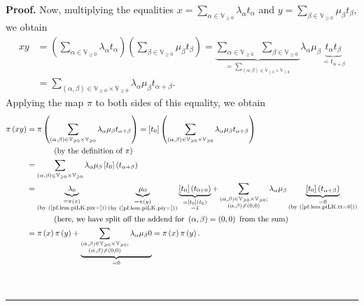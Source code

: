 \documentclass[numbers=enddot,12pt,final,onecolumn,notitlepage]{scrartcl}%
\theoremstyle{definition}
\newenvironment{proof}[1][Proof]{\noindent\textbf{#1.} }{\ \rule{0.5em}{0.5em}}
\let\sumnonlimits\sum
\renewcommand{\sum}{\sumnonlimits\limits}
\renewcommand{\geq}{\geqslant}
\theoremstyle{plainsl}
\begin{document}
\begin{proof}
Now, multiplying the equalities $x=\sum_{\alpha\in\mathbb{V}_{\geq0}}%
\lambda_{\alpha}t_{\alpha}$ and $y=\sum_{\beta\in\mathbb{V}_{\geq0}}\mu
_{\beta}t_{\beta}$, we obtain%
\begin{align*}
xy  &  =\left(  \sum_{\alpha\in\mathbb{V}_{\geq0}}\lambda_{\alpha}t_{\alpha
}\right)  \left(  \sum_{\beta\in\mathbb{V}_{\geq0}}\mu_{\beta}t_{\beta
}\right)  =\underbrace{\sum_{\alpha\in\mathbb{V}_{\geq0}}\ \ \sum_{\beta
\in\mathbb{V}_{\geq0}}}_{=\sum_{\left(  \alpha,\beta\right)  \in
\mathbb{V}_{\geq0}\times\mathbb{V}_{\geq0}}}\lambda_{\alpha}\mu_{\beta
}\underbrace{t_{\alpha}t_{\beta}}_{=t_{\alpha+\beta}}\\
&  =\sum_{\left(  \alpha,\beta\right)  \in\mathbb{V}_{\geq0}\times
\mathbb{V}_{\geq0}}\lambda_{\alpha}\mu_{\beta}t_{\alpha+\beta}.
\end{align*}
Applying the map $\pi$ to both sides of this equality, we obtain%
\begin{align*}
\pi\left(  xy\right)   &  =\pi\left(  \sum_{\left(  \alpha,\beta\right)
\in\mathbb{V}_{\geq0}\times\mathbb{V}_{\geq0}}\lambda_{\alpha}\mu_{\beta
}t_{\alpha+\beta}\right)  =\left[  t_{0}\right]  \left(  \sum_{\left(
\alpha,\beta\right)  \in\mathbb{V}_{\geq0}\times\mathbb{V}_{\geq0}}%
\lambda_{\alpha}\mu_{\beta}t_{\alpha+\beta}\right) \\
&  \ \ \ \ \ \ \ \ \ \ \left(  \text{by the definition of }\pi\right) \\
&  =\sum_{\left(  \alpha,\beta\right)  \in\mathbb{V}_{\geq0}\times
\mathbb{V}_{\geq0}}\lambda_{\alpha}\mu_{\beta}\left[  t_{0}\right]  \left(
t_{\alpha+\beta}\right) \\
&  =\underbrace{\lambda_{0}}_{\substack{=\pi\left(  x\right)  \\\text{(by
(\ref{pf.lem.piLK.pix=}))}}}\underbrace{\mu_{0}}_{\substack{=\pi\left(
y\right)  \\\text{(by (\ref{pf.lem.piLK.piy=}))}}}\underbrace{\left[
t_{0}\right]  \left(  t_{0+0}\right)  }_{\substack{=\left[  t_{0}\right]
\left(  t_{0}\right)  \\=1}}+\sum_{\substack{\left(  \alpha,\beta\right)
\in\mathbb{V}_{\geq0}\times\mathbb{V}_{\geq0};\\\left(  \alpha,\beta\right)
\neq\left(  0,0\right)  }}\lambda_{\alpha}\mu_{\beta}\underbrace{\left[
t_{0}\right]  \left(  t_{\alpha+\beta}\right)  }_{\substack{=0\\\text{(by
(\ref{pf.lem.piLK.tt=0}))}}}\\
&  \ \ \ \ \ \ \ \ \ \ \left(  \text{here, we have split off the addend for
}\left(  \alpha,\beta\right)  =\left(  0,0\right)  \text{ from the sum}\right)
\\
&  =\pi\left(  x\right)  \pi\left(  y\right)  +\underbrace{\sum
_{\substack{\left(  \alpha,\beta\right)  \in\mathbb{V}_{\geq0}\times
\mathbb{V}_{\geq0};\\\left(  \alpha,\beta\right)  \neq\left(  0,0\right)
}}\lambda_{\alpha}\mu_{\beta}0}_{=0}=\pi\left(  x\right)  \pi\left(  y\right)
.
\end{align*}



\end{proof}
\end{document}
